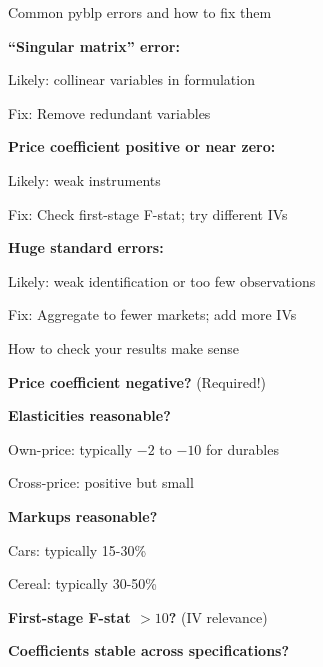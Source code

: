 \documentclass[notes,11pt, aspectratio=169]{beamer}
\newenvironment{wideitemize}{\itemize\addtolength{\itemsep}{10pt}}{\enditemize}
\newenvironment{wideenumerate}{\enumerate\addtolength{\itemsep}{10pt}}{\endenumerate}
\begin{document}
\begin{frame}{Common pyblp errors and how to fix them}
	\begin{wideitemize}
		\item \textbf{``Singular matrix'' error:} \pause
		\begin{wideitemize}
			\vspace{3pt}
			\item Likely: collinear variables in formulation
			\item Fix: Remove redundant variables
		\end{wideitemize}
		\item \textbf{Price coefficient positive or near zero:} \pause
		\begin{wideitemize}
			\vspace{3pt}
			\item Likely: weak instruments
			\item Fix: Check first-stage F-stat; try different IVs
		\end{wideitemize}
		\item \textbf{Huge standard errors:} \pause
		\begin{wideitemize}
			\vspace{3pt}
			\item Likely: weak identification or too few observations
			\item Fix: Aggregate to fewer markets; add more IVs
		\end{wideitemize}
	\end{wideitemize}
\end{frame}

\begin{frame}{How to check your results make sense}
	\begin{wideenumerate}
		\item \textbf{Price coefficient negative?} (Required!)
		\item \textbf{Elasticities reasonable?}
		\begin{wideitemize}
			\vspace{3pt}
			\item Own-price: typically $-2$ to $-10$ for durables
			\item Cross-price: positive but small
		\end{wideitemize}
		\item \textbf{Markups reasonable?}
		\begin{wideitemize}
			\vspace{3pt}
			\item Cars: typically 15-30\%
			\item Cereal: typically 30-50\%
		\end{wideitemize}
		\item \textbf{First-stage F-stat $> 10$?} (IV relevance)
		\item \textbf{Coefficients stable across specifications?}
	\end{wideenumerate}
\end{frame}
\end{document}
